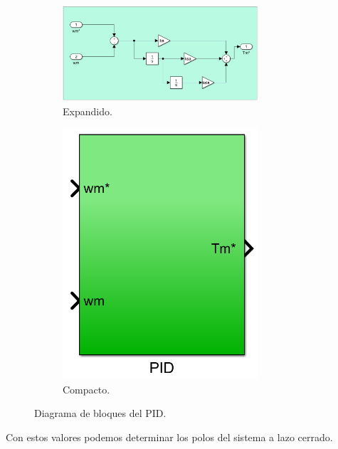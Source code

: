 \documentclass{article}
\begin{document}
\begin{figure}[H]
    \begin{subfigure}[b]{0.75\textwidth}
        \centering
        \includegraphics[width=0.8\textwidth]{pid.png}
        \caption{Expandido.}
    \end{subfigure}
    \begin{subfigure}[b]{0.24\textwidth}
        \centering
        \includegraphics[width=0.8\textwidth]{pid_compacto.png}
        \caption{Compacto.}
    \end{subfigure}
    \caption{Diagrama de bloques del PID.}
\end{figure}

Con estos valores podemos determinar los polos del sistema a lazo cerrado.
\end{document}
